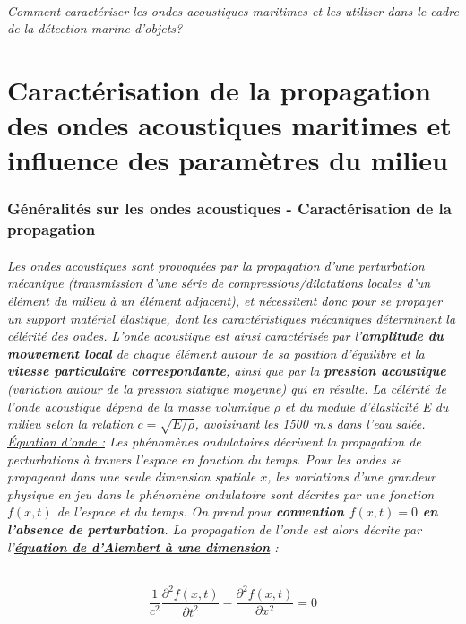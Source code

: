 \documentclass[a4paper,11pt]{article}
\begin{document}
\paragraph{Comment caract\'{e}riser les ondes acoustiques maritimes et les utiliser dans le cadre de la d\'{e}tection marine d'objets?} \newpage
\part{Caract\'{e}risation de la propagation des ondes acoustiques maritimes et influence des param\`{e}tres du milieu}
\section{G\'{e}n\'{e}ralit\'{e}s sur les ondes acoustiques - Caract\'{e}risation de la propagation}
\paragraph{\normalfont Les ondes acoustiques sont provoqu\'{e}es par la propagation d'une perturbation m\'{e}canique (transmission d'une s\'{e}rie de compressions/dilatations locales d'un \'{e}l\'{e}ment du milieu \`{a} un \'{e}l\'{e}ment adjacent), et n\'{e}cessitent donc pour se propager un support mat\'{e}riel \'{e}lastique, dont les caract\'{e}ristiques m\'{e}caniques d\'{e}terminent la c\'{e}l\'{e}rit\'{e} des ondes. L'onde acoustique est ainsi caract\'{e}ris\'{e}e par l'\textbf{amplitude du mouvement local} de chaque \'{e}l\'{e}ment autour de sa position d'\'{e}quilibre et la \textbf{vitesse particulaire correspondante}, ainsi que par la \textbf{pression acoustique} (variation autour de la pression statique moyenne) qui en r\'{e}sulte. La c\'{e}l\'{e}rit\'{e} de l'onde acoustique d\'{e}pend de la masse volumique $\rho$ et du module d'\'{e}lasticit\'{e} E du milieu selon la relation $c=\sqrt{E/\rho}$, avoisinant les 1500 m.s dans l'eau sal\'{e}e. \newline \newline
\underline{\'{E}quation d'onde :}\newline
Les ph\'{e}nom\`{e}nes ondulatoires d\'{e}crivent la propagation de perturbations \`{a} travers l'espace en fonction du temps. Pour les ondes se propageant dans une seule dimension spatiale $x$, les variations d'une grandeur physique en jeu dans le ph\'{e}nom\`{e}ne ondulatoire sont d\'{e}crites par une fonction $f(x,t)$ de l'espace et du temps. On prend pour \textbf{convention $f(x,t) = 0$ en l'absence de perturbation}. La propagation de l'onde est alors d\'{e}crite par l'\textbf{\underline{\'{e}quation de d'Alembert \`{a} une dimension}} :}
\[ \frac{1}{c^{2}}\frac{\partial^{2} f(x,t)}{\partial t^{2}}-\frac{\partial^{2} f(x,t)}{\partial x^{2}}=0\]
\end{document}
